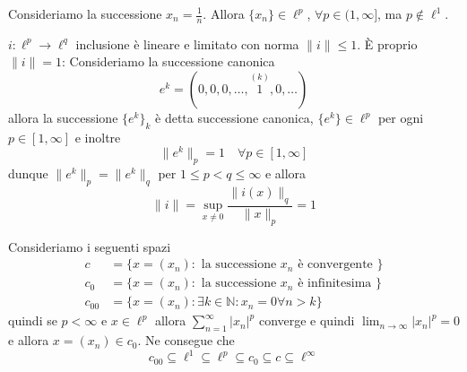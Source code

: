 \begin{example}
    Consideriamo la successione \(x_{n} = \frac{1}{n}\). Allora \(\{x_{n}\} \in
    \ell^{p}\), \(\forall p \in (1, \infty]\), ma \(p \not\in \ell^{1}\).
\end{example}
\begin{example}
    \(i : \ell^{p} \to \ell^{q} \) inclusione è lineare e limitato con norma
    \(\|i\| \le 1\). È proprio \(\|i\| = 1\): Consideriamo la successione
    canonica
    \[
        e^{k} = {(0, 0, 0, \dots, \overset{{(k)}}{1}, 0, \dots )}
    \]
    allora la successione \(\{e^{k}\}_k \) è detta successione canonica,
    \(\{e^{k}\} \in \ell^{p}\) per ogni \(p \in [1, \infty]\) e inoltre
    \[
        \|e^{k}\|_p = 1 \quad \forall p \in [1, \infty]   
    \]
    dunque \(\|e^{k}\|_p = \|e^{k}\|_q\) per \(1 \le p < q \le \infty\) e allora
    \[
        \|i\| = \sup_{x \neq 0} \frac{\|i{(x)}\|_q}{\|x\|_p} = 1
    \]
\end{example}
Consideriamo i seguenti spazi
\hypertarget{spazi_c}{\begin{align*}
    c &= \{x = {(x_{n})} : \text{ la successione \(x_{n}\) è convergente }\} \\
    c_{0} &= \{x = {(x_{n})} : \text{ la successione \(x_{n}\) è infinitesima }
    \} \\
    c_{00}  &= \{x = {(x_{n})}: \exists k \in \mathbb{N} : x_{n} = 0 \forall n >
    k\} 
\end{align*}}
quindi se \(p < \infty\) e \(x \in \ell^{p}\) allora \(\sum_{n=1}^{\infty}
|x_{n}|^{p} \) converge e quindi \(\lim_{n \to \infty} |x_{n}|^{p} = 0\) e
allora \(x = {(x_{n})} \in c_{0}\). Ne consegue che
\[
    c_{00} \subseteq \ell^{1} \subseteq \ell^{p} \subseteq c_{0} \subseteq c
    \subseteq \ell^{\infty}  
\]


